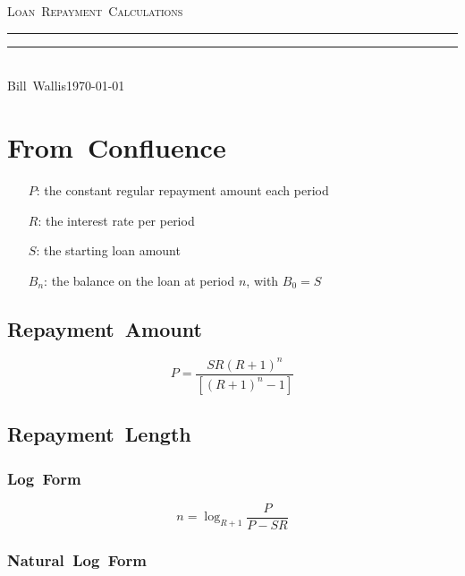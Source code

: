 \documentclass[a4paper, 10pt]{article}
\begin{document}
\pagestyle{plain}

\begin{center}
    {\huge\scshape Loan~Repayment~Calculations}
    \rule{\textwidth}{1.6pt}\vspace*{-\baselineskip}\vspace*{2pt}
    \rule{\textwidth}{0.4pt}\\[0.2\baselineskip]
    {\Large\quad\quad Bill~Wallis\hfill\today \quad\quad}
\end{center}

\tableofcontents






\section{From~Confluence}\label{sec:from-confluence}

\begin{itemize}
    \item[$P$:] the constant regular repayment amount each period
    \item[$R$:] the interest rate per period
    \item[$S$:] the starting loan amount
    \item[$B_{n}$:] the balance on the loan at period $n$, with $B_{0} = S$
\end{itemize}


\subsection{Repayment~Amount}\label{subsec:repayment-amount}

\[
    P = \frac{ SR(R + 1)^{n} }{ [(R + 1)^{n} - 1] }
\]


\subsection{Repayment~Length}\label{subsec:repayment-length}

\subsubsection{Log~Form}

\[
    n = \log_{R + 1}\frac{P}{P - SR}
\]

\subsubsection{Natural~Log~Form}
\end{document}
